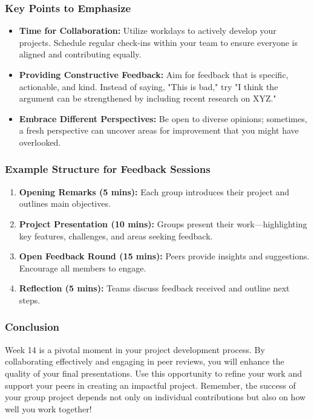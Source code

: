 \documentclass[aspectratio=169]{beamer}
\begin{document}
\begin{frame}[fragile]
    \frametitle{Key Points to Emphasize}
    \begin{itemize}
        \item \textbf{Time for Collaboration:} Utilize workdays to actively develop your projects. Schedule regular check-ins within your team to ensure everyone is aligned and contributing equally.
        \item \textbf{Providing Constructive Feedback:} Aim for feedback that is specific, actionable, and kind. Instead of saying, "This is bad," try "I think the argument can be strengthened by including recent research on XYZ."
        \item \textbf{Embrace Different Perspectives:} Be open to diverse opinions; sometimes, a fresh perspective can uncover areas for improvement that you might have overlooked.
    \end{itemize}
\end{frame}

\begin{frame}[fragile]
    \frametitle{Example Structure for Feedback Sessions}
    \begin{enumerate}
        \item \textbf{Opening Remarks (5 mins):} Each group introduces their project and outlines main objectives.
        \item \textbf{Project Presentation (10 mins):} Groups present their work—highlighting key features, challenges, and areas seeking feedback.
        \item \textbf{Open Feedback Round (15 mins):} Peers provide insights and suggestions. Encourage all members to engage.
        \item \textbf{Reflection (5 mins):} Teams discuss feedback received and outline next steps.
    \end{enumerate}
\end{frame}

\begin{frame}[fragile]
    \frametitle{Conclusion}
    Week 14 is a pivotal moment in your project development process. By collaborating effectively and engaging in peer reviews, you will enhance the quality of your final presentations. Use this opportunity to refine your work and support your peers in creating an impactful project. Remember, the success of your group project depends not only on individual contributions but also on how well you work together!
\end{frame}
\end{document}

